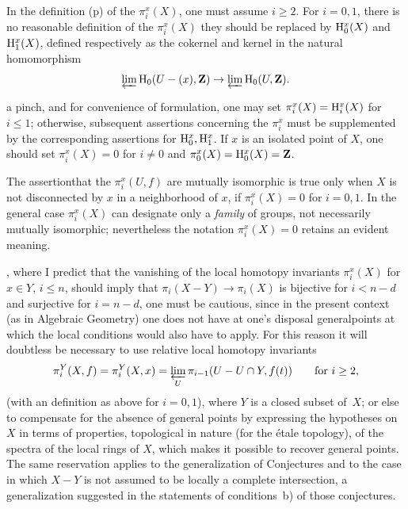 \label{p25y}%
In the definition (p\ptbl{}) of the $\pi_i^x(X)$, one must assume $i\geq 2$. For $i=0,1$, there is no reasonable definition of the $\pi_i^x(X)$\sisi{,}{;} they should be replaced by $\mathrm H_0^x(X)$ and $\mathrm H_1^x(X)$, defined respectively as the co\sisi{-}{}kernel and kernel in the natural homomorphism
$$
\varprojlim \mathrm H_0(U-(x),\mathbf Z)\to\varprojlim\mathrm H_0(U,\mathbf Z).
$$

 a pinch, and for convenience of formulation, one may set $\pi_i^x(X)=\mathrm H_i^x(X)$ for $i\leq 1$; otherwise, subsequent assertions concerning the $\pi_i^x$ must be supplemented by the corresponding assertions for $\mathrm H_0^x,\mathrm H_1^x$. If $x$ is an isolated point of $X$, one should set $\pi_i^x(X)=0$ for $i\neq 0$ and $\pi_0^x(X)=\mathrm H_0^x(X)=\mathbf Z$.

The assertion\pageoriginale that the $\pi_i^x(U,f)$ are mutually isomorphic is true only when $X$ is not disconnected by $x$ in a neighborhood of $x$, \ie if $\pi_i^x(X)=0$ for $i=0,1$. In the general case $\pi_i^x(X)$ can designate only a \emph{family} of groups, not necessarily mutually isomorphic; nevertheless the notation $\pi_i^x(X)=0$ retains an evident meaning.

\label{p26y}, where I predict that the vanishing of the local homotopy invariants $\pi_i^x(X)$ for $x\in Y$, $i\leq n$, should imply that $\pi_i(X-Y)\to\pi_i(X)$ is bijective for $i<n-d$ and surjective for $i=n-d$, one must be cautious, since in the present context (as in Algebraic Geometry) one does not have at one's disposal \og general\fg points at which the local conditions would also have to apply. For this reason it will doubtless be necessary to use relative local homotopy invariants
$$
\pi_i^Y(X,f)=\pi_i^Y(X,x)=\varprojlim_U\pi_{i-1}(U-U\cap Y,f(t))\qquad\text{for }i\geq 2,
$$
(with an {} definition as above for $i=0,1$), where $Y$ is a closed subset of~$X$; or else to compensate for the absence of general points by expressing the hypotheses on $X$ in terms of properties, topological in nature (for the \'etale topology), of the spectra of the local rings of $X$, which makes it possible to recover general points. The same reservation applies to the generalization of Conjectures  and  to the case in which $X-Y$ is not assumed to be locally a complete intersection, a generalization suggested in the statements of conditions~b) of those conjectures.

